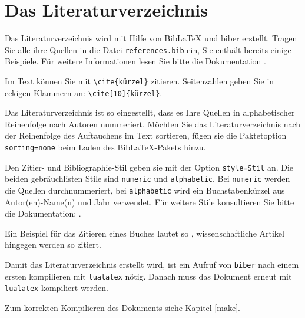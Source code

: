\section{Das Literaturverzeichnis}

Das Literaturverzeichnis wird mit Hilfe von BibLaTeX und biber erstellt.
Tragen Sie alle ihre Quellen in die Datei \texttt{references.bib} ein, Sie enthält bereits
einige Beispiele. Für weitere Informationen lesen Sie bitte die Dokumentation \cite{biblatex}.

Im Text können Sie mit \verb_\cite{kürzel}_ zitieren. Seitenzahlen geben Sie in eckigen Klammern an:
\verb_\cite[10]{kürzel}_.

Das Literaturverzeichnis ist so eingestellt, dass es Ihre Quellen in alphabetischer Reihenfolge nach Autoren nummeriert.
Möchten Sie das Literaturverzeichnis nach der Reihenfolge des Auftauchens im Text sortieren, fügen sie die Paktetoption \texttt{sorting=none} beim Laden
des BibLaTeX-Pakets hinzu.

Den Zitier- und Bibliographie-Stil geben sie mit der Option \texttt{style=Stil} an. Die beiden gebräuchlisten Stile sind \texttt{numeric} und \texttt{alphabetic}.
Bei \texttt{numeric} werden die Quellen durchnummeriert, bei \texttt{alphabetic} wird ein Buchstabenkürzel aus Autor(en)-Name(n) und Jahr verwendet.
Für weitere Stile konsultieren Sie bitte die Dokumentation: \cite{biblatex}.

Ein Beispiel für das Zitieren eines Buches lautet so \cite{handbook_adhesives},
wissenschaftliche Artikel hingegen werden so \cite{einstein} zitiert.

Damit das Literaturverzeichnis erstellt wird, ist ein Aufruf von \texttt{biber} nach einem ersten kompilieren mit \texttt{lualatex} nötig.
Danach muss das Dokument erneut mit \texttt{lualatex} kompiliert werden.

Zum korrekten Kompilieren des Dokuments siehe Kapitel \ref{make}.
